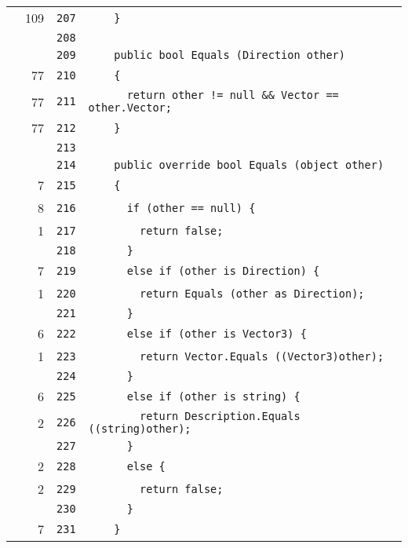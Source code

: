 \documentclass[a4paper,10pt]{article}
\begin{document}
\begin{longtable}[l]{lrrl}
\cellcolor{green} & 109 & \verb~207~ & \verb~    }~\\
\cellcolor{gray} &  & \verb~208~ & \verb~~\\
\cellcolor{gray} &  & \verb~209~ & \verb~    public bool Equals (Direction other)~\\
\cellcolor{green} & 77 & \verb~210~ & \verb~    {~\\
\cellcolor{green} & 77 & \verb~211~ & \verb~      return other != null && Vector == other.Vector;~\\
\cellcolor{green} & 77 & \verb~212~ & \verb~    }~\\
\cellcolor{gray} &  & \verb~213~ & \verb~~\\
\cellcolor{gray} &  & \verb~214~ & \verb~    public override bool Equals (object other)~\\
\cellcolor{green} & 7 & \verb~215~ & \verb~    {~\\
\cellcolor{green} & 8 & \verb~216~ & \verb~      if (other == null) {~\\
\cellcolor{green} & 1 & \verb~217~ & \verb~        return false;~\\
\cellcolor{gray} &  & \verb~218~ & \verb~      }~\\
\cellcolor{green} & 7 & \verb~219~ & \verb~      else if (other is Direction) {~\\
\cellcolor{green} & 1 & \verb~220~ & \verb~        return Equals (other as Direction);~\\
\cellcolor{gray} &  & \verb~221~ & \verb~      }~\\
\cellcolor{green} & 6 & \verb~222~ & \verb~      else if (other is Vector3) {~\\
\cellcolor{green} & 1 & \verb~223~ & \verb~        return Vector.Equals ((Vector3)other);~\\
\cellcolor{gray} &  & \verb~224~ & \verb~      }~\\
\cellcolor{green} & 6 & \verb~225~ & \verb~      else if (other is string) {~\\
\cellcolor{green} & 2 & \verb~226~ & \verb~        return Description.Equals ((string)other);~\\
\cellcolor{gray} &  & \verb~227~ & \verb~      }~\\
\cellcolor{green} & 2 & \verb~228~ & \verb~      else {~\\
\cellcolor{green} & 2 & \verb~229~ & \verb~        return false;~\\
\cellcolor{gray} &  & \verb~230~ & \verb~      }~\\
\cellcolor{green} & 7 & \verb~231~ & \verb~    }~\\

\end{longtable}
\end{document}

